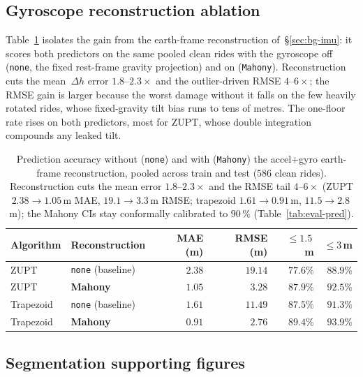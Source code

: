 \documentclass[manuscript,review,screen]{acmart}
\begin{document}
\subsection{Gyroscope reconstruction ablation}
\label{app:eval-reconstruct}

Table~\ref{tab:eval-reconstruct} isolates the gain from the earth-frame
reconstruction of~\S\ref{sec:bg-imu}: it scores both predictors on the
same pooled clean rides with the gyroscope off (\texttt{none}, the fixed
rest-frame gravity projection) and on (\texttt{Mahony}).  Reconstruction
cuts the mean~$\Delta h$ error $1.8$--$2.3\times$ and the outlier-driven
RMSE $4$--$6\times$; the RMSE gain is larger because the worst damage
without it falls on the few heavily rotated rides, whose fixed-gravity
tilt bias runs to tens of metres.  The one-floor rate rises on both
predictors, most for ZUPT, whose double integration compounds any leaked
tilt.

\begin{table}[H]
\centering
\small
\begin{tabular}{llrrrr}
\toprule
Algorithm & Reconstruction & MAE (m) & RMSE (m) & $\le 1.5$\,m & $\le 3$\,m \\
\midrule
ZUPT      & \texttt{none} (baseline) & $2.38$ & $19.14$ & $77.6\%$ & $88.9\%$ \\
ZUPT      & \textbf{Mahony}          & $\mathbf{1.05}$ & $\mathbf{3.28}$ & $\mathbf{87.9\%}$ & $\mathbf{92.5\%}$ \\
\midrule
Trapezoid & \texttt{none} (baseline) & $1.61$ & $11.49$ & $87.5\%$ & $91.3\%$ \\
Trapezoid & \textbf{Mahony}          & $\mathbf{0.91}$ & $\mathbf{2.76}$ & $\mathbf{89.4\%}$ & $\mathbf{93.9\%}$ \\
\bottomrule
\end{tabular}
\caption{Prediction accuracy without (\texttt{none}) and with
  (\texttt{Mahony}) the accel+gyro earth-frame reconstruction, pooled
  across train and test ($586$ clean rides).  Reconstruction cuts the
  mean error $1.8$--$2.3\times$ and the RMSE tail $4$--$6\times$ (ZUPT
  $2.38\!\to\!1.05$\,m MAE, $19.1\!\to\!3.3$\,m RMSE; trapezoid
  $1.61\!\to\!0.91$\,m, $11.5\!\to\!2.8$\,m); the Mahony CIs stay
  conformally calibrated to $90\,\%$ (Table~\ref{tab:eval-pred}).}
\label{tab:eval-reconstruct}
\end{table}

\subsection{Segmentation supporting figures}
\label{app:eval-extra-seg}
\end{document}

